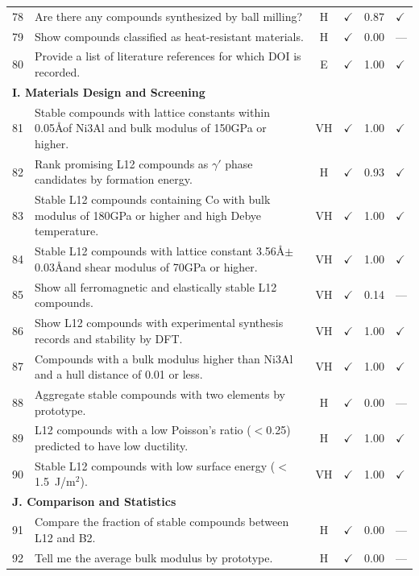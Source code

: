 \documentclass[5p,twocolumn]{elsarticle}
\begin{document}
\begin{longtable}{clcccl}
    78 & Are there any compounds synthesized by ball milling? & H & $\checkmark$ & 0.87 & $\checkmark$ \\
    79 & Show compounds classified as heat-resistant materials. & H & $\checkmark$ & 0.00 & --- \\
    80 & Provide a list of literature references for which DOI is recorded. & E & $\checkmark$ & 1.00 & $\checkmark$ \\
    \midrule
    \multicolumn{6}{l}{\textbf{I. Materials Design and Screening}} \\
    \midrule
    81 & Stable compounds with lattice constants within 0.05\AA  of Ni3Al and bulk modulus of 150GPa or higher. & VH & $\checkmark$ & 1.00 & $\checkmark$ \\
    82 & Rank promising L12 compounds as $\gamma'$ phase candidates by formation energy. & H & $\checkmark$ & 0.93 & $\checkmark$ \\
    83 & Stable L12 compounds containing Co with bulk modulus of 180GPa or higher and high Debye temperature. & VH & $\checkmark$ & 1.00 & $\checkmark$ \\
    84 & Stable L12 compounds with lattice constant 3.56\AA $\pm$0.03\AA  and shear modulus of 70GPa or higher. & VH & $\checkmark$ & 1.00 & $\checkmark$ \\
    85 & Show all ferromagnetic and elastically stable L12 compounds. & VH & $\checkmark$ & 0.14 & --- \\
    86 & Show L12 compounds with experimental synthesis records and stability by DFT. & VH & $\checkmark$ & 1.00 & $\checkmark$ \\
    87 & Compounds with a bulk modulus higher than Ni3Al and a hull distance of 0.01 or less. & VH & $\checkmark$ & 1.00 & $\checkmark$ \\
    88 & Aggregate stable compounds with two elements by prototype. & H & $\checkmark$ & 0.00 & --- \\
    89 & L12 compounds with a low Poisson's ratio ($<$0.25) predicted to have low ductility. & H & $\checkmark$ & 1.00 & $\checkmark$ \\
    90 & Stable L12 compounds with low surface energy ($<$1.5~J/m$^2$). & VH & $\checkmark$ & 1.00 & $\checkmark$ \\
    \midrule
    \multicolumn{6}{l}{\textbf{J. Comparison and Statistics}} \\
    \midrule
    91 & Compare the fraction of stable compounds between L12 and B2. & H & $\checkmark$ & 0.00 & --- \\
    92 & Tell me the average bulk modulus by prototype. & H & $\checkmark$ & 0.00 & --- \\

\end{longtable}
\end{document}
